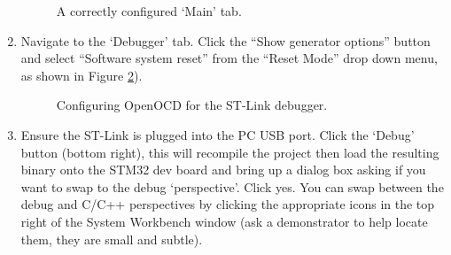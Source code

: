 \documentclass{UoNMCHA}
\numberwithin{equation}{section}
\begin{document}
\begin{enumerate}
   \begin{figure}[H]
    \caption{A correctly configured `Main' tab.}
    \label{fig:elf_filled_in}
    \end{figure}


    \item Navigate to the `Debugger' tab. Click the ``Show generator options'' button and select ``Software system reset'' from the ``Reset Mode'' drop down menu, as shown in Figure \ref{fig:openocdconfig}).
   
    \begin{figure}[H]
    \caption{Configuring OpenOCD for the ST-Link debugger.}
    \label{fig:openocdconfig}
    \end{figure}

    \item Ensure the ST-Link is plugged into the PC USB port.  Click the `Debug' button (bottom right), this will recompile the project then load the resulting binary onto the STM32 dev board and bring up a dialog box asking if you want to swap to the debug `perspective'. Click yes. You can swap between the debug and C/C++ perspectives by clicking the appropriate icons in the top right of the System Workbench window (ask a demonstrator to help locate them, they are small and subtle).


\end{enumerate}
\end{document}
